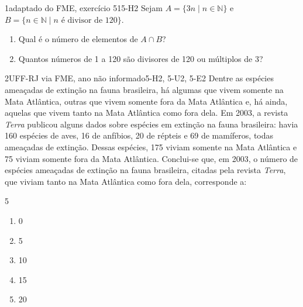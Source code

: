 \begin{questao}[integradora]{1}{adaptado do FME, exercício 51}{5-H2}\label{u5:fme51}
Sejam $A=\{3n\mid n\in\mathbb{N}\}$ e $B=\{n\in\mathbb{N}\mid n\text{ é divisor de }120\}$.
\begin{enumerate}[label=\alph*)]
  \item Qual é o número de elementos de $A\cap B$?
  \item Quantos números de 1 a 120 são divisores de 120 ou múltiplos de 3?
\end{enumerate}
\end{questao}

\begin{questao}{2}{UFF-RJ via FME, ano não informado}{5-H2, 5-U2, 5-E2}\label{u5:uff12}
Dentre as espécies ameaçadas de extinção na fauna brasileira, há algumas que vivem somente na Mata Atlântica, outras que vivem somente fora da Mata Atlântica e, há ainda, aquelas que vivem tanto na Mata Atlântica como fora dela. Em 2003, a revista \emph{Terra} publicou alguns dados sobre espécies em extinção na fauna brasileira: havia 160 espécies de aves, 16 de anfíbios, 20 de répteis e 69 de mamíferos, todas ameaçadas de extinção. Dessas espécies, 175 viviam somente na Mata Atlântica e 75 viviam somente fora da Mata Atlântica. Conclui-se que, em 2003, o número de espécies ameaçadas de extinção na fauna brasileira, citadas pela revista \emph{Terra}, que viviam tanto na Mata Atlântica como fora dela, corresponde a:
\begin{multicols}{5}
\begin{enumerate}[label=\alph*)]
  \item 0
  \item 5
  \item 10
  \item 15
  \item 20
\end{enumerate}
\end{multicols}
\end{questao}

